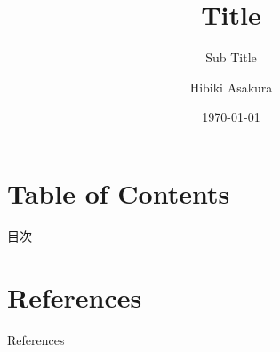 \documentclass[9pt,xcolor=dvipsnames,dvipdfmx]{beamer}
\title{Title}
\subtitle{Sub Title}
\author[H.Asakura]{Hibiki Asakura}
\institute[Kyoto Univ.]{Kyoto University}
\date{\today}
\begin{document}
\begin{frame}[noframenumbering]
  \titlepage
\end{frame}


\section*{Table of Contents}

\begin{frame}{目次}
    \tableofcontents[hideallsubsections]
\end{frame}






\section*{References}

\begin{frame}{References}
    \renewcommand{\refname}{References}
    
\end{frame}



\end{document}
